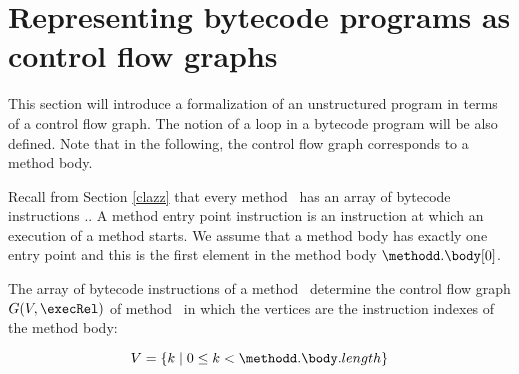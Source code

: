 \newtheorem{defEdge}{Definition}[section]
\newtheorem{defLoop}[defEdge]{Definition}

\newtheorem{defInv}[defEdge]{Definition}
\newtheorem{defModif}[defEdge]{Definition}

\newtheorem{propPath}{Lemma}[section]

\section{Representing bytecode programs as control flow graphs}\label{prelim:ctrFlow}

This section will introduce a formalization of an unstructured program in terms of a control flow graph.
The notion of a loop in a bytecode program will be also defined. Note that in the following,
the control flow graph corresponds to a method body. 


Recall from Section \ref{clazz} that every method \methodd \ has an array of bytecode instructions \methodd.\body.
 A method entry point instruction is  an instruction at which an execution of a method starts.
 We assume that a method body has exactly one entry point
 and this is the first element in the method body $\methodd.\body[0]$.

 The array of bytecode instructions of a method \methodd \ determine the control flow graph $G( V , \execRel ) $   of method \methodd \ 
in which the vertices are the instruction indexes of the method body:

$$ V = \{ k \mid   0 \leq k < \methodd.\body.length  \}$$


